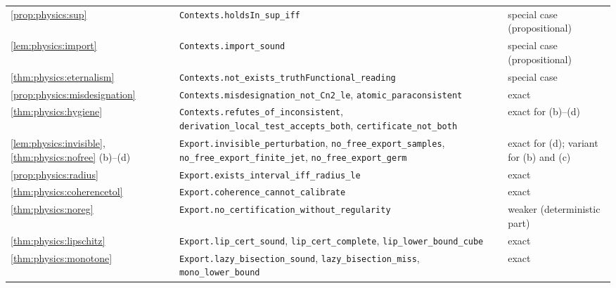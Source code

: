 {\begin{longtable}{@{}>{\raggedright\arraybackslash}p{2.9cm}>{\raggedright\arraybackslash}p{7.6cm}>{\raggedright\arraybackslash}p{4.4cm}@{}}
\cref{prop:physics:sup} & \texttt{Contexts.\allowbreak holdsIn\_sup\_iff} & special case (propositional)\\
\cref{lem:physics:import} & \texttt{Contexts.\allowbreak import\_sound} & special case (propositional)\\
\cref{thm:physics:eternalism} & \texttt{Contexts.\allowbreak not\_exists\_truthFunctional\_reading} & special case\\
\cref{prop:physics:misdesignation} & \texttt{Contexts.\allowbreak misdesignation\_not\_Cn2\_le}, \texttt{atomic\_paraconsistent} & exact\\
\cref{thm:physics:hygiene} & \texttt{Contexts.\allowbreak refutes\_of\_inconsistent}, \texttt{derivation\_local\_test\_accepts\_both}, \texttt{certificate\_not\_both} & exact for (b)--(d)\\
\cref{lem:physics:invisible}, \cref{thm:physics:nofree} (b)--(d) & \texttt{Export.\allowbreak invisible\_perturbation}, \texttt{no\_free\_export\_samples}, \texttt{no\_free\_export\_finite\_jet}, \texttt{no\_free\_export\_germ} & exact for (d); variant for (b) and (c)\\
\cref{prop:physics:radius} & \texttt{Export.\allowbreak exists\_interval\_iff\_radius\_le} & exact\\
\cref{thm:physics:coherencetol} & \texttt{Export.\allowbreak coherence\_cannot\_calibrate} & exact\\
\cref{thm:physics:noreg} & \texttt{Export.\allowbreak no\_certification\_without\_regularity} & weaker (deterministic part)\\
\cref{thm:physics:lipschitz} & \texttt{Export.\allowbreak lip\_cert\_sound}, \texttt{lip\_cert\_complete}, \texttt{lip\_lower\_bound\_cube} & exact\\
\cref{thm:physics:monotone} & \texttt{Export.\allowbreak lazy\_bisection\_sound}, \texttt{lazy\_bisection\_miss}, \texttt{mono\_lower\_bound} & exact\\
\bottomrule
\end{longtable}
}
